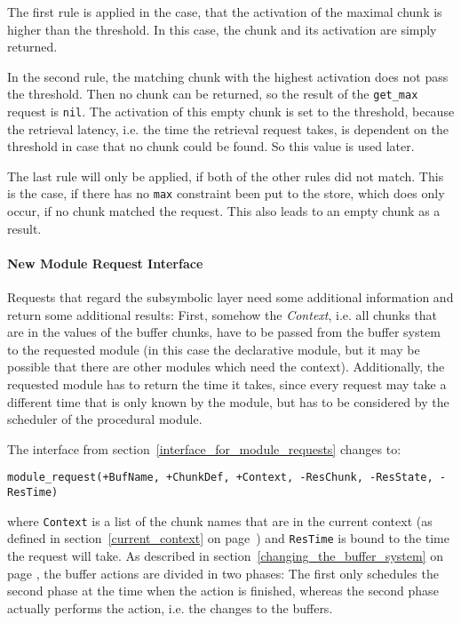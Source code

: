 The first rule is applied in the case, that the activation of the maximal chunk is higher than the threshold. In this case, the chunk and its activation are simply returned.

In the second rule, the matching chunk with the highest activation does not pass the threshold. Then no chunk can be returned, so the result of the \lstinline|get_max| request is \lstinline|nil|. The activation of this empty chunk is set to the threshold, because the retrieval latency, i.e. the time the retrieval request takes, is dependent on the threshold in case that no chunk could be found. So this value is used later.

The last rule will only be applied, if both of the other rules did not match. This is the case, if there has no \lstinline|max| constraint been put to the store, which does only occur, if no chunk matched the request. This also leads to an empty chunk as a result.

\paragraph{New Module Request Interface}

Requests that regard the subsymbolic layer need some additional information and return some additional results: First, somehow the \emph{Context}, i.e. all chunks that are in the values of the buffer chunks, have to be passed from the buffer system to the requested module (in this case the declarative module, but it may be possible that there are other modules which need the context). Additionally, the requested module has to return the time it takes, since every request may take a different time that is only known by the module, but has to be considered by the scheduler of the procedural module.

The interface from section~\ref{interface_for_module_requests} changes to:

\begin{lstlisting}
module_request(+BufName, +ChunkDef, +Context, -ResChunk, -ResState, -ResTime) 
\end{lstlisting}

where \lstinline|Context| is a list of the chunk names that are in the current context (as defined in section~\ref{current_context} on page~\pageref{current_context}) and \lstinline|ResTime| is bound to the time the request will take. As described in section~\ref{changing_the_buffer_system} on page \pageref{changing_the_buffer_system}, the buffer actions are divided in two phases: The first only schedules the second phase at the time when the action is finished, whereas the second phase actually performs the action, i.e. the changes to the buffers.

